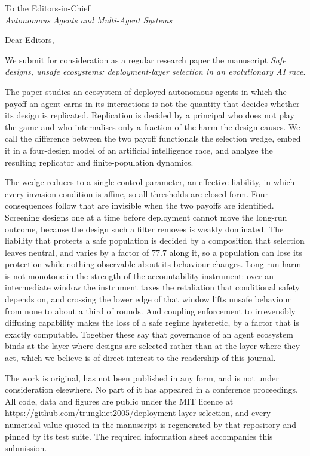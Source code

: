 \documentclass[11pt,a4paper]{article}
\begin{document}
\noindent
To the Editors-in-Chief\\
\textit{Autonomous Agents and Multi-Agent Systems}

\bigskip

\noindent
Dear Editors,

We submit for consideration as a regular research paper the manuscript
\textit{Safe designs, unsafe ecosystems: deployment-layer selection in an
evolutionary AI race}.

The paper studies an ecosystem of deployed autonomous agents in which the
payoff an agent earns in its interactions is not the quantity that decides
whether its design is replicated. Replication is decided by a principal who
does not play the game and who internalises only a fraction of the harm the
design causes. We call the difference between the two payoff functionals the
selection wedge, embed it in a four-design model of an artificial intelligence
race, and analyse the resulting replicator and finite-population dynamics.

The wedge reduces to a single control parameter, an effective liability, in
which every invasion condition is affine, so all thresholds are closed form.
Four consequences follow that are invisible when the two payoffs are
identified. Screening designs one at a time before deployment cannot move the
long-run outcome, because the design such a filter removes is weakly dominated.
The liability that protects a safe population is decided by a composition that
selection leaves neutral, and varies by a factor of $77.7$ along it, so a
population can lose its protection while nothing observable about its
behaviour changes. Long-run harm is not monotone in the strength of the accountability instrument:
over an intermediate window the instrument taxes the retaliation that
conditional safety depends on, and crossing the lower edge of that window lifts
unsafe behaviour from none to about a third of rounds. And coupling
enforcement to irreversibly diffusing capability makes the loss of a safe
regime hysteretic, by a factor that is exactly computable. Together these say
that governance of an agent ecosystem binds at the layer where designs are
selected rather than at the layer where they act, which we believe is of direct
interest to the readership of this journal.

The work is original, has not been published in any form, and is not under
consideration elsewhere. No part of it has appeared in a conference
proceedings. All code, data and figures are public under the MIT licence at
\url{https://github.com/trungkiet2005/deployment-layer-selection}, and every
numerical value quoted in the manuscript is regenerated by that repository and
pinned by its test suite. The required information sheet accompanies this
submission.
\end{document}
